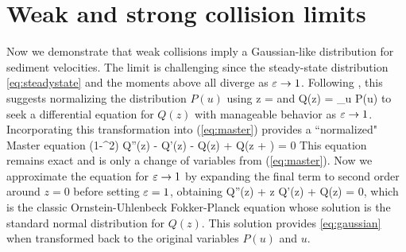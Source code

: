\section{Weak and strong collision limits}
Now we demonstrate that weak collisions imply a Gaussian-like distribution for sediment velocities. The limit is challenging since the steady-state distribution \ref{eq:steadystate} and the moments above all diverge as $\varepsilon \rightarrow 1$.
Following \cite{Hall1970}, this suggests normalizing the distribution $P(u)$ using 
\be z =  \ee
and 
\be Q(z) = \sigma_u P(u)\ee
to seek a differential equation for $Q(z)$ with manageable behavior as $\varepsilon \rightarrow 1$.
Incorporating this transformation into (\ref{eq:master}) provides a ``normalized" Master equation
\be (1-\ve^2)  Q''(z) - Q'(z) - Q(z) +  Q\Big(z + \Big) = 0 \ee
This equation remains exact and is only a change of variables from (\ref{eq:master}).
Now we approximate the equation for $\varepsilon \rightarrow 1$ by expanding the final term to second order around $z=0$ before setting $\varepsilon = 1$, obtaining
\be Q''(z) + z Q'(z) + Q(z) = 0, \ee
which is the classic Ornstein-Uhlenbeck Fokker-Planck equation whose solution is the standard normal distribution for $Q(z)$. This solution provides \ref{eq:gaussian} when transformed back to the original variables $P(u)$ and $u$.
